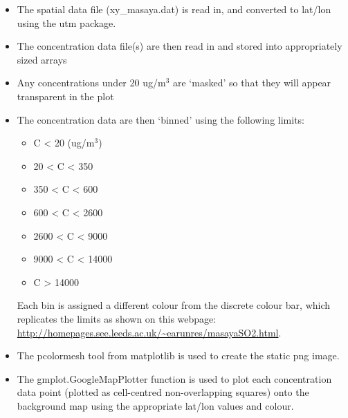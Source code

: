 \documentclass[10pt,a4paper]{article}
\begin{document}
\begin{itemize}
\item The spatial data file (xy\_masaya.dat) is read in, and converted to lat/lon using the utm package.
\item The concentration data file(s) are then read in and stored into appropriately sized arrays
\item Any concentrations under 20 ug/m$^3$ are ‘masked’ so that they will appear transparent in the plot
\item The concentration data are then ‘binned’ using the following limits:
\begin{itemize}
\item C < 20 (ug/m$^3$)
\item 20 < C < 350
\item 350 < C < 600
\item 600 < C < 2600
\item 2600 < C < 9000
\item 9000 < C < 14000
\item C > 14000
\end{itemize}
Each bin is assigned a different colour from the discrete colour bar, which replicates the limits as shown on this webpage: \url{http://homepages.see.leeds.ac.uk/~earunres/masayaSO2.html}.
\item The pcolormesh tool from matplotlib is used to create the static png image.
\item The gmplot.GoogleMapPlotter function is used to plot each concentration data point (plotted as cell-centred non-overlapping squares) onto the background map using the appropriate lat/lon values and colour.
\end{itemize}
\end{document}
